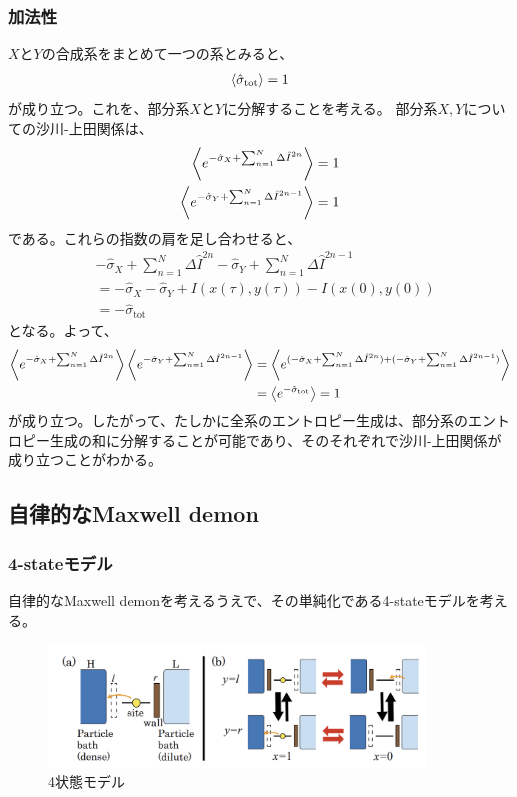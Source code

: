 \documentclass[a4paper,11pt]{jsarticle}
\numberwithin{equation}{section}
\begin{document}
\subsubsection{加法性}
$X$と$Y$の合成系をまとめて一つの系とみると、
\begin{align}
    \ev{\hat{\sigma}_{\text{tot}}} = 1
\end{align}
が成り立つ。これを、部分系$X$と$Y$に分解することを考える。
部分系$X,Y$についての沙川-上田関係は、
\begin{align}
    \ev{e^{-\hat{\sigma}_X + \sum_{n=1}^N \Delta \hat{I}^{2n}}} = 1 \\
    \ev{e^{-\hat{\sigma}_Y + \sum_{n=1}^N \Delta \hat{I}^{2n-1}}} = 1
\end{align}
である。これらの指数の肩を足し合わせると、
\begin{align}
    &-\hat{\sigma}_X + \sum_{n=1}^N \Delta \hat{I}^{2n} -\hat{\sigma}_Y + \sum_{n=1}^N \Delta \hat{I}^{2n-1} \\
    &= -\hat{\sigma}_{X} -\hat{\sigma}_{Y} + I(x(\tau), y(\tau)) - I(x(0), y(0))\\
    &= -\hat{\sigma}_{\text{tot}}
\end{align}
となる。よって、
\begin{align}
    \ev{e^{-\hat{\sigma}_{X} + \sum_{n=1}^N \Delta \hat{I}^{2n}} } \ev{e^{-\hat{\sigma}_{Y} + \sum_{n=1}^N \Delta \hat{I}^{2n-1}} } 
    &= \ev{e^{(-\hat{\sigma}_{X} + \sum_{n=1}^N \Delta \hat{I}^{2n}) + (-\hat{\sigma}_{Y} + \sum_{n=1}^N \Delta \hat{I}^{2n-1})}} \\
    &= \ev{e^{-\hat{\sigma}_{\text{tot}}} } = 1 
\end{align}
が成り立つ。したがって、たしかに全系のエントロピー生成は、部分系のエントロピー生成の和に分解することが可能であり、そのそれぞれで沙川-上田関係が成り立つことがわかる。

\subsection{自律的なMaxwell demon}
\subsubsection{4-stateモデル}
自律的なMaxwell demonを考えるうえで、その単純化である4-stateモデルを考える。\\

\begin{figure}[H]
    \begin{center}
    \includegraphics[width=100mm]{4state.png}
    \end{center}
    \caption{4状態モデル}
    \label{fig:4state}
\end{figure}
\end{document}
